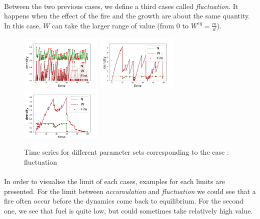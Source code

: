 \documentclass{article}
\begin{document}
\paragraph{}
Between the two previous cases, we define a third cases called \textit{fluctuation}. It happens when the effect of the fire and the growth are about the same quantity. In this case, $W$ can take the larger range of value (from $0$ to $W^{eq}=\frac{m}{d}$).
\begin{figure}[h!]
\centering
\includegraphics[width=3.9cm]{middle_1.png}
\includegraphics[width=3.9cm]{middle_2.png}
\includegraphics[width=3.9cm]{middle_3.png}
\caption{Time series for different parameter sets corresponding to the case : fluctuation}
\end{figure}



\newpage
\paragraph{}
In order to visualise the limit of each cases, examples for each limits are presented.
For the limit between \textit{accumulation} and \textit{fluctuation} we could see that a fire often occur before the dynamics come back to equilibrium. For the second one, we see that fuel is quite low, but could sometimes take relatively high value.
\end{document}
